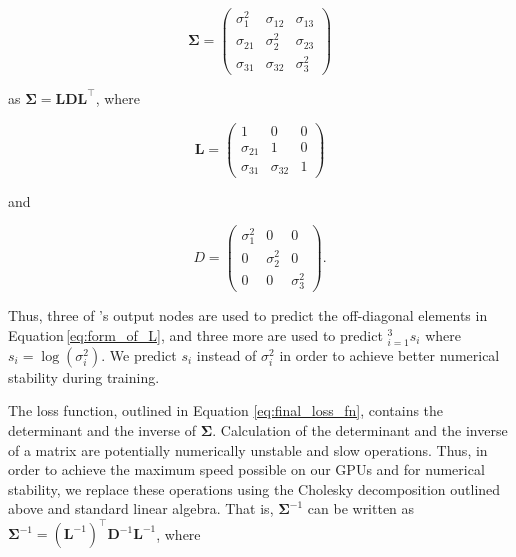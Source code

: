 \begin{equation}
\boldsymbol{\Sigma} = \left(\begin{array}{ccc}
\sigma_{1}^{2} & \sigma_{12} & \sigma_{13} \\
\sigma_{21} & \sigma_{2}^{2} & \sigma_{23} \\
\sigma_{31} & \sigma_{32} & \sigma_{3}^{2}
\end{array}\right)
\label{eq:full_sigma_matrix}
\end{equation}

\noindent
as $\boldsymbol{\Sigma} = \boldsymbol{L}\boldsymbol{D}\boldsymbol{L}^{\top}$, where 

\begin{equation}
\boldsymbol{L} = \left(\begin{array}{lll}
1 & 0 & 0 \\
\sigma_{21} & 1 & 0 \\
\sigma_{31} & \sigma_{32} & 1
\end{array}\right)
\label{eq:form_of_L}
\end{equation}

\noindent
and 

\begin{equation}
D=\left(\begin{array}{ccc}
\sigma_{1}^{2} & 0 & 0 \\
0 & \sigma_{2}^{2} & 0 \\
0 & 0 & \sigma_{3}^{2}
\end{array}\right) .
\label{eq:form_of_D}
\end{equation}

\noindent
Thus, three of \gampen{}'s output nodes are used to predict the off-diagonal elements in Equation\,\ref{eq:form_of_L},
and three more are used to predict $_{i=1}^3s_i$ where $s_i=\log(\sigma_i^2)$. We predict $s_i$ instead of $\sigma_i^2$ in order to achieve better numerical stability during training. 

The loss function, outlined in Equation \ref{eq:final_loss_fn}, contains the determinant and the inverse of $\boldsymbol{\Sigma}$. Calculation of the determinant and the inverse of a matrix are potentially numerically unstable and slow operations. Thus, in order to achieve the maximum speed possible on our GPUs and for numerical stability, we replace these operations using the Cholesky decomposition outlined above and standard linear algebra. 
That is, $\boldsymbol{\Sigma}^{-1}$ can be written as $\boldsymbol{\Sigma}^{-1}=\left(\boldsymbol{L}^{-1}\right)^{\top} \boldsymbol{D}^{-1} \boldsymbol{L}^{-1}$, where 

